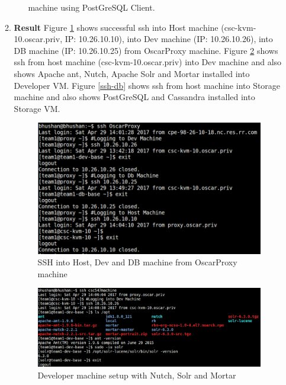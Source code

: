 \begin{enumerate}
\begin{enumerate}[label={}]
\begin{enumerate}
        machine using PostGreSQL Client.
     \end{enumerate}    
  \item \textbf{Result}\newline
    Figure \ref{ssh-db-dev-host} shows successful ssh into Host
    machine (csc-kvm-10.oscar.priv, IP: 10.26.10.10), into Dev machine
    (IP: 10.26.10.26), into DB machine (IP: 10.26.10.25) from
    OscarProxy machine. 
    Figure \ref{ssh-dev} shows ssh from
    host machine (csc-kvm-10.oscar.priv) into Dev machine and also
    shows Apache ant, Nutch, Apache Solr and Mortar installed into
    Developer VM.
    Figure \ref{ssh-db} shows ssh from host machine into Storage machine
    and also shows PostGreSQL and Cassandra installed into Storage VM.
    \begin{figure}
      \centering
      \includegraphics[scale=0.4]{screenshots/ssh-db-dev-host.png}
      \caption{SSH into Host, Dev and DB machine from OscarProxy machine}
      \label{ssh-db-dev-host}
    \end{figure}
    \begin{figure}
      \centering
      \includegraphics[scale=0.4]{screenshots/ssh-dev.png}
      \caption{Developer machine setup with Nutch, Solr and Mortar}
      \label{ssh-dev}
    \end{figure}
    \begin{figure}

\end{figure}
\end{enumerate}
\end{enumerate}

